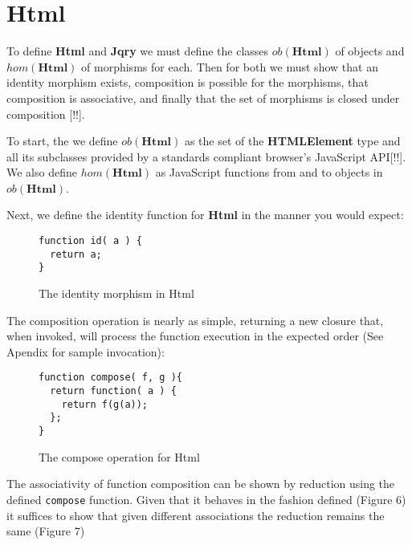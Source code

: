 \documentclass[preprint]{sigplanconf}
\begin{document}
\section{Html}

To define \textbf{Html} and \textbf{Jqry} we must define the classes \begin{math}ob(\mathbf{Html})\end{math} of objects and \begin{math}hom(\mathbf{Html})\end{math} of morphisms for each. Then for both we must show that an identity morphism exists, composition is possible for the morphisms, that composition is associative, and finally that the set of morphisms is closed under composition [!!].

To start, the we define \begin{math}ob(\mathbf{Html})\end{math} as the set of the \textbf{HTMLElement} type and all its subclasses provided by a standards compliant browser's JavaScript API[!!]. We also define \begin{math}hom(\mathbf{Html})\end{math} as JavaScript functions from and to objects in \begin{math}ob(\mathbf{Html})\end{math}.

Next, we define the identity function for \textbf{Html} in the manner you would expect:

\begin{figure}[h!]
\begin{verbatim}
function id( a ) {
  return a;
}
\end{verbatim}
\nocaptionrule \caption{The identity morphism in Html}
\end{figure}

The composition operation is nearly as simple, returning a new closure that, when invoked, will process the function execution in the expected order (See Apendix for sample invocation):

\begin{figure}[h!]
\begin{verbatim}
function compose( f, g ){
  return function( a ) {
    return f(g(a));
  };
}
\end{verbatim}
\nocaptionrule \caption{The compose operation for Html}
\end{figure}

The associativity of function composition can be shown by reduction using the defined \verb|compose| function. Given that it behaves in the fashion defined (Figure 6) it suffices to show that given different associations the reduction remains the same (Figure 7)
\end{document}
